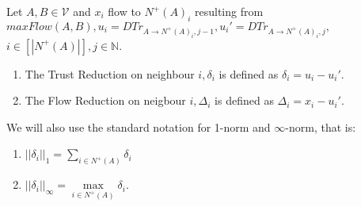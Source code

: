 \begin{definition}
   Let $A, B \in \mathcal{V}$ and $x_i$ flow to $N^{+}(A)_i$ resulting from $maxFlow(A,B), u_i = 
   DTr_{A \rightarrow N^{+}(A)_i,j-1}, u_i' = DTr_{A \rightarrow N^{+}(A)_i,j},$ \\ $i \in [|N^{+}(A)|], 
   j \in \mathbb{N}$. 
   \begin{enumerate} 
      \item The Trust Reduction on neighbour $i, \delta_i$ is defined as $\delta_i = u_i - u_i'$. 
      \item The Flow Reduction on neigbour $i, \Delta_i$ is defined as $\Delta_i = x_i - u_i'$. 
   \end{enumerate} 
   We will also use the standard notation for 1-norm and $\infty$-norm, that is: 
   \begin{enumerate} 
      \item $||\delta_i||_1 = \sum\limits_{i \in N^{+}(A)}\delta_i$ 
      \item $||\delta_i||_\infty = \max\limits_{i \in N^{+}(A)}\delta_i$. 
   \end{enumerate} 
\end{definition} 
